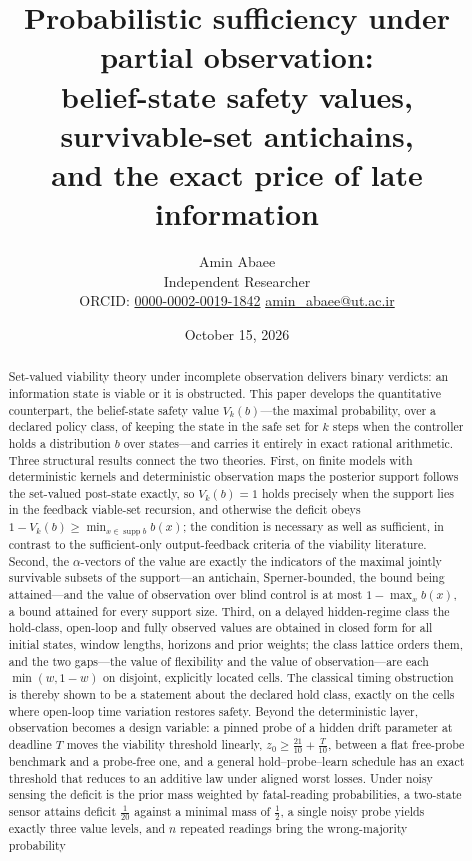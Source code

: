 \documentclass[11pt,a4paper]{article}
\theoremstyle{plain}
\theoremstyle{definition}
\theoremstyle{remark}
\newcommand{\supp}{\operatorname{supp}}
\begin{document}
\title{\textbf{Probabilistic sufficiency under partial observation:\\ belief-state safety values, survivable-set antichains,\\ and the exact price of late information}}
\author{Amin Abaee\\[0.3em]
{\small Independent Researcher}\\[0.2em]
{\small ORCID: \href{https://orcid.org/0000-0002-0019-1842}{0000-0002-0019-1842}\quad
\href{mailto:amin_abaee@ut.ac.ir}{amin\_abaee@ut.ac.ir}}}
\date{October 15, 2026}
\maketitle

\begin{abstract}
\noindent
Set-valued viability theory under incomplete observation delivers binary verdicts: an information state is viable or it is obstructed. This paper develops the quantitative counterpart, the belief-state safety value $V_k(b)$---the maximal probability, over a declared policy class, of keeping the state in the safe set for $k$ steps when the controller holds a distribution $b$ over states---and carries it entirely in exact rational arithmetic. Three structural results connect the two theories. First, on finite models with deterministic kernels and deterministic observation maps the posterior support follows the set-valued post-state exactly, so $V_k(b)=1$ holds precisely when the support lies in the feedback viable-set recursion, and otherwise the deficit obeys $1-V_k(b)\ge\min_{x\in\supp b}b(x)$; the condition is necessary as well as sufficient, in contrast to the sufficient-only output-feedback criteria of the viability literature. Second, the $\alpha$-vectors of the value are exactly the indicators of the maximal jointly survivable subsets of the support---an antichain, Sperner-bounded, the bound being attained---and the value of observation over blind control is at most $1-\max_x b(x)$, a bound attained for every support size. Third, on a delayed hidden-regime class the hold-class, open-loop and fully observed values are obtained in closed form for all initial states, window lengths, horizons and prior weights; the class lattice orders them, and the two gaps---the value of flexibility and the value of observation---are each $\min(w,1-w)$ on disjoint, explicitly located cells. The classical timing obstruction is thereby shown to be a statement about the declared hold class, exactly on the cells where open-loop time variation restores safety. Beyond the deterministic layer, observation becomes a design variable: a pinned probe of a hidden drift parameter at deadline $T$ moves the viability threshold linearly, $z_0\ge\tfrac{21}{10}+\tfrac{T}{10}$, between a flat free-probe benchmark and a probe-free one, and a general hold--probe--learn schedule has an exact threshold that reduces to an additive law under aligned worst losses. Under noisy sensing the deficit is the prior mass weighted by fatal-reading probabilities, a two-state sensor attains deficit $\tfrac1{20}$ against a minimal mass of $\tfrac12$, a single noisy probe yields exactly three value levels, and $n$ repeated readings bring the wrong-majority probability 
\end{abstract}
\end{document}
